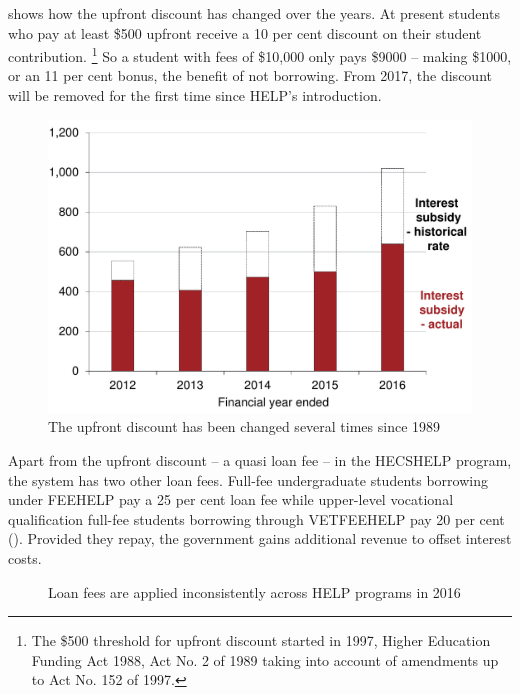 \documentclass[embargoed]{grattan}
\begin{document}
{ shows how the upfront discount has changed over the years.
At present students who pay at least \$500 upfront receive a 10 per cent discount on their student contribution.%
\footnote{The \$500 threshold for upfront discount started in 1997, Higher Education Funding Act 1988, Act No. 2 of 1989 taking into account of amendments up to Act No. 152 of 1997.} So a student with fees of \$10,000 only pays \$9000 -- making \$1000, or an 11 per cent bonus, the benefit of not borrowing.
From 2017, the discount will be removed for the first time since \gls{HELP}'s introduction.

\begin{figure}
\caption{The upfront discount has been changed several times since 1989}\label{fig:fig18-the-upfront-discount-has-been-changed-several-times-since-1989}

\includegraphics[page=18]{atlas/Chartpack.pdf}

\end{figure}

Apart from the upfront discount -- a quasi loan fee -- in the \gls{HECSHELP} program, the system has two other loan fees.
Full-fee undergraduate students borrowing under \gls{FEEHELP} pay a 25 per cent loan fee while upper-level vocational qualification full-fee students borrowing through \gls{VETFEEHELP} pay 20 per cent ().
Provided they repay, the government gains additional revenue to offset interest costs.

\begin{figure}
\caption[Loan fees are applied inconsistently across HELP programs in 2016]{Loan fees are applied inconsistently across \gls{HELP} programs in 2016}\label{fig:fig19-loan-fees-are-applied-inconsitently-across-HELP-programs-2016}


\end{figure}}
\end{document}
